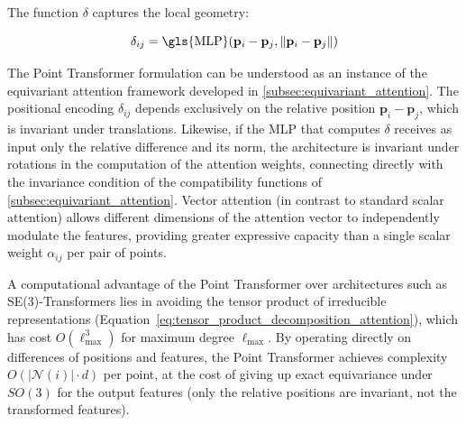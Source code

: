 The function $\delta$ captures the local geometry:

\begin{equation}
    \delta_{ij} = \text{\gls{MLP}}(\mathbf{p}_i - \mathbf{p}_j, \|\mathbf{p}_i - \mathbf{p}_j\|)
    \label{eq:positional_encoding_3d}
\end{equation}

The Point \gls{Transformer} formulation can be understood as an instance of the equivariant attention framework developed in \autoref{subsec:equivariant_attention}. The positional encoding $\delta_{ij}$ depends exclusively on the relative position $\mathbf{p}_i - \mathbf{p}_j$, which is invariant under translations. Likewise, if the \gls{MLP} that computes $\delta$ receives as input only the relative difference and its norm, the architecture is invariant under rotations in the computation of the attention weights, connecting directly with the invariance condition of the compatibility functions of \autoref{subsec:equivariant_attention}. Vector attention (in contrast to standard scalar attention) allows different dimensions of the attention vector to independently modulate the features, providing greater expressive capacity than a single scalar weight $\alpha_{ij}$ per pair of points.

A computational advantage of the Point \gls{Transformer} over architectures such as SE(3)-\glspl{Transformer} lies in avoiding the tensor product of irreducible representations (Equation~\eqref{eq:tensor_product_decomposition_attention}), which has cost $O(\ell_{\max}^3)$ for maximum degree $\ell_{\max}$. By operating directly on differences of positions and features, the Point \gls{Transformer} achieves complexity $O(|\mathcal{N}(i)| \cdot d)$ per point, at the cost of giving up exact equivariance under $SO(3)$ for the output features (only the relative positions are invariant, not the transformed features).
